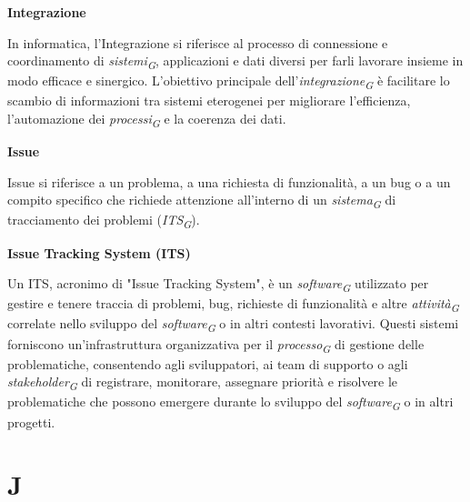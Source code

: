 \documentclass{article}
\begin{document}
\vspace{0.4cm}

\textbf{Integrazione}

\vspace{0.1cm}

In informatica, l'Integrazione si riferisce al processo di connessione e coordinamento di \textit{sistemi}\textsubscript{\textit{G}}, applicazioni e dati diversi per farli lavorare insieme in modo efficace e sinergico. L'obiettivo principale dell'\textit{integrazione}\textsubscript{\textit{G}} è facilitare lo scambio di informazioni tra sistemi eterogenei per migliorare l'efficienza, l'automazione dei \textit{processi}\textsubscript{\textit{G}} e la coerenza dei dati.

\vspace{0.4cm}

\textbf{Issue}

\vspace{0.1cm}

Issue si riferisce a un problema, a una richiesta di funzionalità, a un bug o a un compito specifico che richiede attenzione all'interno di un \textit{sistema}\textsubscript{\textit{G}} di tracciamento dei problemi (\textit{ITS}\textsubscript{\textit{G}}).

\vspace{0.4cm}

\textbf{Issue Tracking System (ITS)}

\vspace{0.1cm}

Un ITS, acronimo di "Issue Tracking System", è un \textit{software}\textsubscript{\textit{G}} utilizzato per gestire e tenere traccia di problemi, bug, richieste di funzionalità e altre \textit{attività}\textsubscript{\textit{G}} correlate nello sviluppo del \textit{software}\textsubscript{\textit{G}} o in altri contesti lavorativi. Questi sistemi forniscono un'infrastruttura organizzativa per il \textit{processo}\textsubscript{\textit{G}} di gestione delle problematiche, consentendo agli sviluppatori, ai team di supporto o agli \textit{stakeholder}\textsubscript{\textit{G}} di registrare, monitorare, assegnare priorità e risolvere le problematiche che possono emergere durante lo sviluppo del \textit{software}\textsubscript{\textit{G}} o in altri progetti.

\pagebreak
\section*{J}
{}
\end{document}
